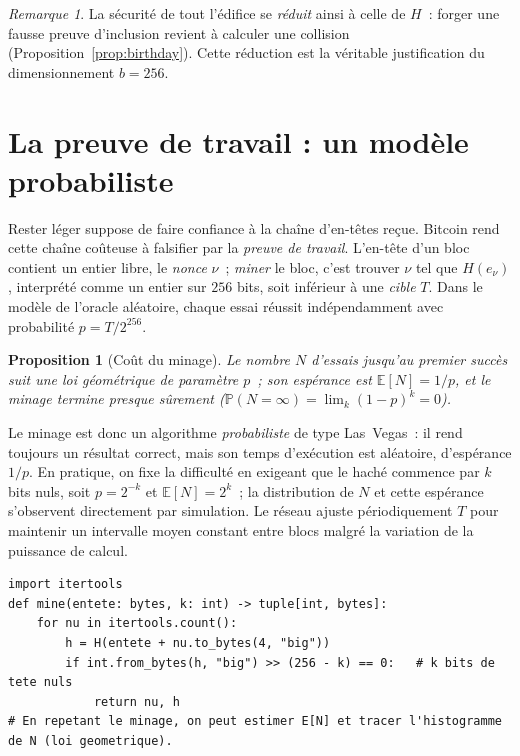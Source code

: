 \documentclass[11pt,a4paper]{article}
\theoremstyle{definition}\newtheorem{definition}{Définition}
\theoremstyle{plain}\newtheorem{theoreme}{Théorème}\newtheorem{proposition}{Proposition}
\theoremstyle{remark}\newtheorem{remarque}{Remarque}
\begin{document}
\begin{remarque}
La sécurité de tout l'édifice se \emph{réduit} ainsi à celle de $H$~: forger une fausse preuve
d'inclusion revient à calculer une collision (Proposition~\ref{prop:birthday}). Cette réduction
est la véritable justification du dimensionnement $b=256$.
\end{remarque}

\section{La preuve de travail : un modèle probabiliste}

Rester léger suppose de faire confiance à la chaîne d'en-têtes reçue. Bitcoin rend cette chaîne
coûteuse à falsifier par la \emph{preuve de travail}. L'en-tête d'un bloc contient un entier
libre, le \emph{nonce} $\nu$~; \emph{miner} le bloc, c'est trouver $\nu$ tel que $H(e_\nu)$,
interprété comme un entier sur $256$ bits, soit inférieur à une \emph{cible} $T$. Dans le modèle
de l'oracle aléatoire, chaque essai réussit indépendamment avec probabilité $p=T/2^{256}$.

\begin{proposition}[Coût du minage]\label{prop:pow}
Le nombre $N$ d'essais jusqu'au premier succès suit une loi géométrique de paramètre $p$~; son
espérance est $\mathbb{E}[N]=1/p$, et le minage \emph{termine presque sûrement}
($\mathbb{P}(N=\infty)=\lim_k (1-p)^{k}=0$).
\end{proposition}

Le minage est donc un algorithme \emph{probabiliste} de type Las~Vegas~: il rend toujours un
résultat correct, mais son temps d'exécution est aléatoire, d'espérance $1/p$. En pratique, on
fixe la difficulté en exigeant que le haché commence par $k$ bits nuls, soit $p=2^{-k}$ et
$\mathbb{E}[N]=2^{k}$~; la distribution de $N$ et cette espérance s'observent directement par
simulation. Le réseau ajuste périodiquement $T$ pour maintenir un intervalle moyen constant entre
blocs malgré la variation de la puissance de calcul.

\begin{lstlisting}
import itertools
def mine(entete: bytes, k: int) -> tuple[int, bytes]:
    for nu in itertools.count():
        h = H(entete + nu.to_bytes(4, "big"))
        if int.from_bytes(h, "big") >> (256 - k) == 0:   # k bits de tete nuls
            return nu, h
# En repetant le minage, on peut estimer E[N] et tracer l'histogramme de N (loi geometrique).
\end{lstlisting}
\end{document}
